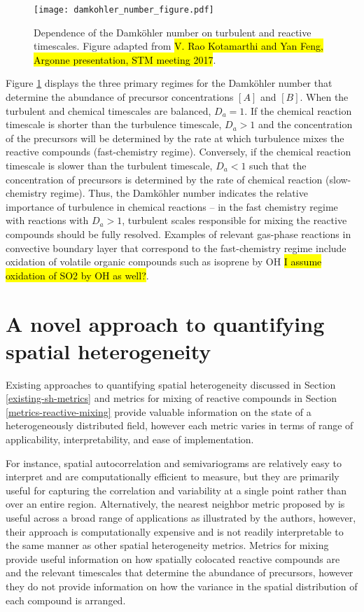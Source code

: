 \begin{figure}[h]
	\centering
	\texttt{[image: damkohler\_number\_figure.pdf]}
	\caption{Dependence of the Damköhler number on turbulent and reactive timescales. Figure adapted from \hl{V. Rao Kotamarthi and Yan Feng, Argonne presentation, STM meeting 2017}.}
	\label{fig:damkohler}
\end{figure}

Figure \ref{fig:damkohler} displays the three primary regimes for the Damköhler number that determine the abundance of precursor concentrations $[A]$ and $[B]$. When the turbulent and chemical timescales are balanced, $D_a = 1$. If the chemical reaction timescale is shorter than the turbulence timescale, $D_a >1$ and the concentration of the precursors will be determined by the rate at which turbulence mixes the reactive compounds (fast-chemistry regime). Conversely, if the chemical reaction timescale is slower than the turbulent timescale, $D_a<1$ such that the concentration of precursors is determined by the rate of chemical reaction (slow-chemistry regime). Thus, the Damköhler number indicates the relative importance of turbulence in chemical reactions -- in the fast chemistry regime with  reactions with $D_a > 1$, turbulent scales responsible for mixing the reactive compounds should be fully resolved. Examples of relevant gas-phase reactions in convective boundary layer that correspond to the fast-chemistry regime include oxidation of volatile organic compounds such as isoprene by OH \hl{I assume oxidation of SO2 by OH as well?}.

\section{A novel approach to quantifying spatial heterogeneity}
Existing approaches to quantifying spatial heterogeneity discussed in Section \ref{existing-sh-metrics} and metrics for mixing of reactive compounds in Section \ref{metrics-reactive-mixing} provide valuable information on the state of a heterogeneously distributed field, however each metric varies in terms of range of applicability, interpretability, and ease of implementation. 

For instance, spatial autocorrelation and semivariograms are relatively easy to interpret and are computationally efficient to measure, but they are primarily useful for capturing the correlation and variability at a single point rather than over an entire region. Alternatively, the nearest neighbor metric proposed by \cite{shu_quantifying_2019} is useful across a broad range of applications as illustrated by the authors, however, their approach is computationally expensive and is not readily interpretable to the same manner as other spatial heterogeneity metrics. Metrics for mixing provide useful information on how spatially colocated reactive compounds are and the relevant timescales that determine the abundance of precursors, however they do not provide information on how the variance in the spatial distribution of each compound is arranged. 

